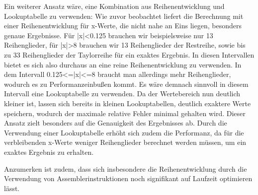 \documentclass[course=erap] {aspdoc}
\begin{document}
     Ein weiterer Ansatz wäre, eine Kombination aus Reihenentwicklung und Lookuptabelle zu verwenden: 
    Wie zuvor beobachtet liefert die Berechnung mit einer Reihenentwicklung für x-Werte, die nicht nahe an Eins liegen, besonders genaue Ergebnisse. Für |x|<0.125 brauchen wir beispielsweise nur 13 Reihenglieder, für |x|>8 brauchen wir 13 Reihenglieder der Restreihe, sowie bis zu 33 Reihenglieder der Taylorreihe für ein exaktes Ergebnis. In diesen Intervallen bietet es sich also durchaus an eine reine Reihenentwicklung zu verwenden. In dem Intervall 0.125<=|x|<=8 braucht man allerdings mehr Reihenglieder, wodurch es zu Performanzeinbußen kommt. Es wäre demnach sinnvoll in diesem Intervall eine Lookuptabelle zu verwenden. Da der Wertebereich nun deutlich kleiner ist, lassen sich bereits in kleinen Lookuptabellen, deutlich exaktere Werte speichern, wodurch der maximale relative Fehler minimal gehalten wird. Dieser Ansatz zielt besonders auf die Genauigkeit des Ergebnisses ab. Durch die Verwendung einer Lookuptabelle erhöht sich zudem die Performanz, da für die verbleibenden x-Werte weniger Reihenglieder berechnet werden müssen, um ein exaktes Ergebnis zu erhalten. 

    Anzumerken ist zudem, dass sich insbesondere die Reihenentwicklung durch die Verwendung von Assemblerinstruktionen noch signifikant auf Laufzeit optimieren lässt. 

    
    
\end{document}
